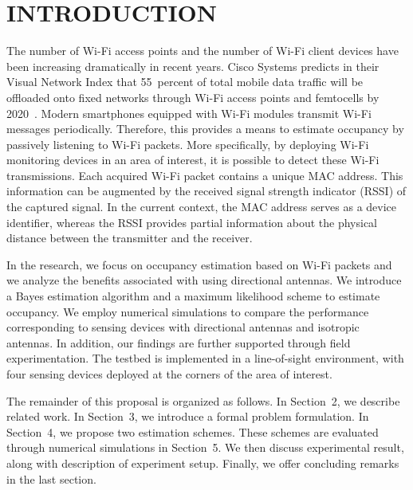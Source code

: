 \chapter[INTRODUCTION]{INTRODUCTION}

The number of Wi-Fi access points and the number of Wi-Fi client devices have been increasing dramatically in recent years.
Cisco Systems predicts in their Visual Network Index that 55~percent of total mobile data traffic will be offloaded onto fixed networks through Wi-Fi access points and femtocells by 2020~\cite{CiscoVNI2016}.
Modern smartphones equipped with Wi-Fi modules transmit Wi-Fi messages periodically.
Therefore, this provides a means to estimate occupancy by passively listening to Wi-Fi packets.
More specifically, by deploying Wi-Fi monitoring devices in an area of interest, it is possible to detect these Wi-Fi transmissions.
Each acquired Wi-Fi packet contains a unique MAC address.
This information can be augmented by the received signal strength indicator (RSSI) of the captured signal.
In the current context, the MAC address serves as a device identifier, whereas the RSSI provides partial information about the physical distance between the transmitter and the receiver.

In the research, we focus on occupancy estimation based on Wi-Fi packets and we analyze the benefits associated with using directional antennas.
We introduce a Bayes estimation algorithm and a maximum likelihood scheme to estimate occupancy.
We employ numerical simulations to compare the performance corresponding to sensing devices with directional antennas and isotropic antennas.
In addition, our findings are further supported through field experimentation.
The testbed is implemented in a line-of-sight environment, with four sensing devices deployed at the corners of the area of interest.

The remainder of this proposal is organized as follows.
In Section~2, we describe related work.
In Section~3, we introduce a formal problem formulation.
In Section~4, we propose two estimation schemes.
These schemes are evaluated through numerical simulations in Section~5.
We then discuss experimental result, along with description of experiment setup.
Finally, we offer concluding remarks in the last section.

 






 


